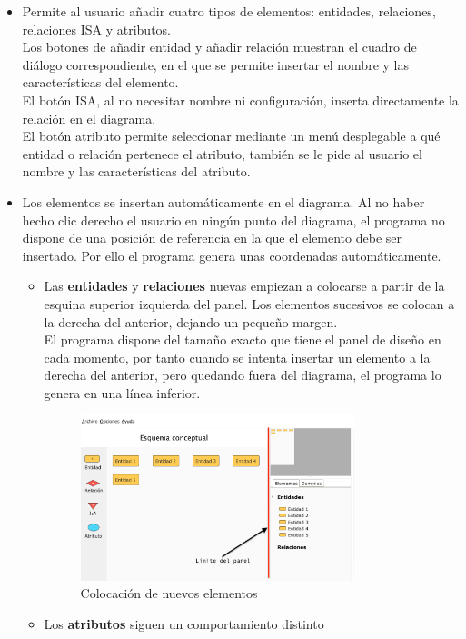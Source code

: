 \begin{itemize}
    \item Permite al usuario añadir cuatro tipos de elementos: entidades, relaciones, relaciones ISA y atributos.\\
    
    Los botones de añadir entidad y añadir relación muestran el cuadro de diálogo correspondiente, en el que se permite insertar el nombre y las características del elemento.\\
    
    El botón ISA, al no necesitar nombre ni configuración, inserta directamente la relación en el diagrama.\\
    
    El botón atributo permite seleccionar mediante un menú desplegable a qué entidad o relación pertenece el atributo, también se le pide al usuario el nombre y las características del atributo.
    \item Los elementos se insertan automáticamente en el diagrama. Al no haber hecho clic derecho el usuario en ningún punto del diagrama, el programa no dispone de una posición de referencia en la que el elemento debe ser insertado. Por ello el programa genera unas coordenadas automáticamente.
    \begin{itemize}
        \item Las \textbf{entidades} y \textbf{relaciones} nuevas empiezan a colocarse a partir de la esquina superior izquierda del panel. Los elementos sucesivos se colocan a la derecha del anterior, dejando un pequeño margen.\\
        
        El programa dispone del tamaño exacto que tiene el panel de diseño en cada momento, por tanto cuando se intenta insertar un elemento a la derecha del anterior, pero quedando fuera del diagrama, el programa lo genera en una línea inferior.
        \begin{figure}[H]
            \centering
            \includegraphics[width=0.8\textwidth]{img/limitepanel.png}
            \caption{Colocación de nuevos elementos}
        \end{figure}
        \item Los \textbf{atributos} siguen un comportamiento distinto
    \end{itemize}
\end{itemize}


